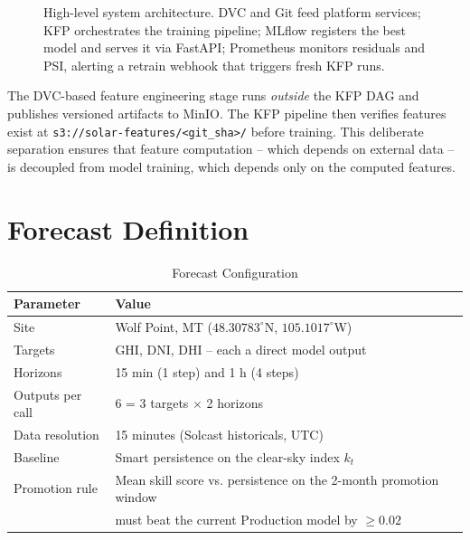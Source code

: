 \documentclass[11pt,a4paper]{article}
\begin{document}
\begin{figure}[H]
\caption{High-level system architecture. DVC and Git feed platform services; KFP orchestrates the training pipeline; MLflow registers the best model and serves it via FastAPI; Prometheus monitors residuals and PSI, alerting a retrain webhook that triggers fresh KFP runs.}
\label{fig:architecture}
\end{figure}

The DVC-based feature engineering stage runs \emph{outside} the KFP DAG and publishes versioned artifacts to MinIO. The KFP pipeline then verifies features exist at \texttt{s3://solar-features/<git\_sha>/} before training. This deliberate separation ensures that feature computation -- which depends on external data -- is decoupled from model training, which depends only on the computed features.

\section{Forecast Definition}

\begin{table}[H]
\centering
\begin{tabular}{@{}ll@{}}
\toprule
\textbf{Parameter} & \textbf{Value} \\
\midrule
Site                 & Wolf Point, MT ($48.30783^\circ$N, $105.1017^\circ$W) \\
Targets              & GHI, DNI, DHI  --  each a direct model output \\
Horizons             & 15 min (1 step) and 1 h (4 steps) \\
Outputs per call     & 6 = 3 targets $\times$ 2 horizons \\
Data resolution      & 15 minutes (Solcast historicals, UTC) \\
Baseline             & Smart persistence on the clear-sky index $k_t$ \\
Promotion rule       & Mean skill score vs. persistence on the 2-month promotion window \\ 
                     & must beat the current Production model by $\geq 0.02$ \\
\bottomrule
\end{tabular}
\caption{Forecast Configuration}
\label{tab:forecast}
\end{table}
\end{document}
